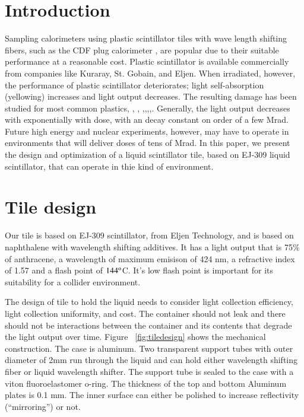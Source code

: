 \documentclass[review]{elsarticle}
\begin{document}
\section{Introduction}
Sampling calorimeters using plastic scintillator tiles with wave length shifting fibers, such as the CDF plug calorimeter \cite{Albrow20022524}, are popular due to their suitable performance at a reasonable cost.  Plastic scintillator is available commercially from companies like Kuraray, St. Gobain, and Eljen.  When irradiated, however, the performance of plastic scintillator deteriorates; light self-absorption (yellowing) increases and light output decreases.  The resulting damage has been studied for most common plastics\cite{34504}, \cite{Wick1991472}, \cite{289295},
\cite{173180},\cite{467829},\cite{Wulkop1995141},\cite{173178},\cite{vasken}.  Generally, the light output decreases with exponentially with dose, with an decay constant on order of a few Mrad.  Future high energy and nuclear experiments, however, may have to operate in environments that will deliver doses of tens of Mrad.  In this paper, we present the design and optimization of a liquid scintillator tile, based on EJ-309 liquid scintillator, that can operate in thie kind of environment.


\section{Tile design}

Our tile is based on EJ-309 scintillator, from Eljen Technology, and is based on naphthalene with wavelength shifting additives.  It has a light output that is 75\% of anthracene, a wavelength of maximum emisison of 424 nm, a refractive index of 1.57 and a flash point of $\rm{144^o}$C.  It's low flash point is important for its suitability for a collider environment.

The design of tile to hold the liquid needs to consider light collection efficiency, light collection uniformity, and cost.  The container should not leak and there should not be interactions between the container and its contents that degrade the light output over time.  Figure ~\ref{fig:tiledesign} shows the mechanical construction.  The case is aluminum.  Two transparent support tubes with outer diameter of 2mm run through the liquid and can hold either wavelength shifting fiber or liquid wavelength shifter.  The support tube is sealed to the case with a viton fluoroelastomer o-ring.  The thickness of the top and bottom Aluminum plates is 0.1 mm.  The inner surface can either be polished to increase reflectivity (``mirroring'') or not.
\end{document}
